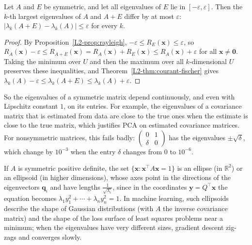 \begin{corollary}[Weyl]\label{L2-cor:weyl}
    Let $A$ and $E$ be symmetric, and let all eigenvalues of $E$ lie in $[-\varepsilon, \varepsilon]$. Then the $k$-th largest eigenvalues of $A$ and $A + E$ differ by at most $\varepsilon$: $|\lambda_k(A + E) - \lambda_k(A)| \leq \varepsilon$ for every $k$.
\end{corollary}

\begin{proof}
    By Proposition~\ref{L2-prop:rayleigh}, $-\varepsilon \leq R_E(\mathbf{x}) \leq \varepsilon$, so $R_A(\mathbf{x}) - \varepsilon \leq R_{A+E}(\mathbf{x}) = R_A(\mathbf{x}) + R_E(\mathbf{x}) \leq R_A(\mathbf{x}) + \varepsilon$ for all $\mathbf{x} \neq \mathbf{0}$. Taking the minimum over $U$ and then the maximum over all $k$-dimensional $U$ preserves these inequalities, and Theorem~\ref{L2-thm:courant-fischer} gives $\lambda_k(A) - \varepsilon \leq \lambda_k(A + E) \leq \lambda_k(A) + \varepsilon$.
\end{proof}

So the eigenvalues of a symmetric matrix depend continuously, and even with Lipschitz constant $1$, on its entries. For example, the eigenvalues of a covariance matrix that is estimated from data are close to the true ones when the estimate is close to the true matrix, which justifies PCA on estimated covariance matrices. For nonsymmetric matrices, this fails badly: $\begin{pmatrix} 0 & 1 \\ \delta & 0 \end{pmatrix}$ has the eigenvalues $\pm\sqrt{\delta}$, which change by $10^{-3}$ when the entry $\delta$ changes from $0$ to $10^{-6}$.

\begin{remark}
    If $A$ is symmetric positive definite, the set $\{\mathbf{x} : \mathbf{x}^\top A \mathbf{x} = 1\}$ is an ellipse (in $\mathbb{R}^2$) or an ellipsoid (in higher dimensions), whose axes point in the directions of the eigenvectors $\mathbf{q}_i$ and have lengths $\frac{1}{\sqrt{\lambda_i}}$, since in the coordinates $\mathbf{y} = Q^\top \mathbf{x}$ the equation becomes $\lambda_1 y_1^2 + \cdots + \lambda_n y_n^2 = 1$. In machine learning, such ellipsoids describe the shape of Gaussian distributions (with $A$ the inverse covariance matrix) and the shape of the loss surface of least squares problems near a minimum; when the eigenvalues have very different sizes, gradient descent zig-zags and converges slowly.
\end{remark}

